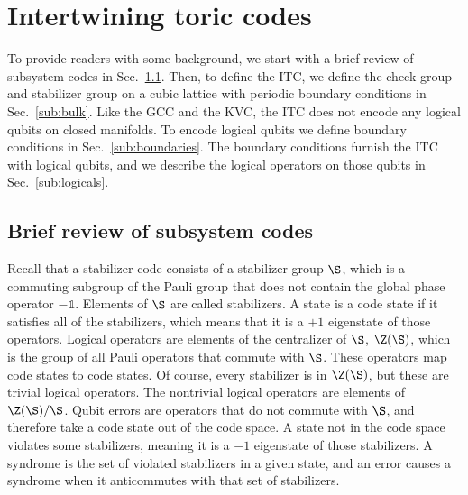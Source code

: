 \section{Intertwining toric codes} \label{sec:build}

To provide readers with some background, we start with a brief review of subsystem codes in Sec.~\ref{sub:subsystem}. Then, to define the ITC, we define the check group and stabilizer group on a cubic lattice with periodic boundary conditions in Sec.~\ref{sub:bulk}. Like the GCC and the KVC, the ITC does not encode any logical qubits on closed manifolds. To encode logical qubits we define boundary conditions in Sec.~\ref{sub:boundaries}. The boundary conditions furnish the ITC with logical qubits, and we describe the logical operators on those qubits in Sec.~\ref{sub:logicals}.

\subsection{Brief review of subsystem codes} \label{sub:subsystem}

Recall that a stabilizer code consists of a stabilizer group $\S$, which is a commuting subgroup of the Pauli group that does not contain the global phase operator $-\mathbb{1}$. Elements of $\S$ are called stabilizers. A state is a code state if it satisfies all of the stabilizers, which means that it is a $+1$ eigenstate of those operators. Logical operators are elements of the centralizer of $\S$, $\Z(\S)$, which is the group of all Pauli operators that commute with $\S$.
These operators map code states to code states. Of course, every stabilizer is in $\Z(\S)$, but these are trivial logical operators. The nontrivial logical operators are elements of $\Z(\S) / \S$. Qubit errors are operators that do not commute with $\S$, and therefore take a code state out of the code space. A state not in the code space violates some stabilizers, meaning it is a $-1$ eigenstate of those stabilizers. 
A syndrome is the set of violated stabilizers in a given state, and an error causes a syndrome when it anticommutes with that set of stabilizers. 

